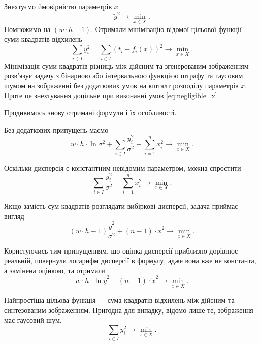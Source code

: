 Знехтуємо ймовірністю параметрів $x$
\begin{equation*}
  \widetilde{y}^2 \to \min\limits_{x \in X}.
\end{equation*}
Помножимо на $\left( w \cdot h - 1 \right)$.
Отримали мінімізацію відомої цільової функції --- суми квадратів відхилень
\begin{equation*}
  \sum_{i \in I} y_i^2
  = \sum_{i \in I} \left( t_i - f_i\left( x \right) \right)^2
  \to \min\limits_{x \in X}.
\end{equation*}
Мінімізація суми квадратів різниць між дійсним та згенерованим зображенням
розв'язує задачу з бінарною або інтервальною функцією штрафу
та гаусовим шумом на зображенні без додаткових умов
на кшталт розподілу параметрів $x$.
Проте це знехтування доцільне при виконанні умов \eqref{eq:negligible_x}.

Продивимось знову отримані формули і їх особливості.

Без додаткових припущень маємо
\begin{equation}\label{eq:minimize}
  w \cdot h \cdot \ln{\sigma^2}
  + \sum_{i \in I} \frac{ y_i^2}{\sigma^2}
  + \sum_{i = 1}^n x_i^2
  \to \min\limits_{x \in X}.
\end{equation}

Оскільки дисперсія є константним невідомим параметром,
можна спростити
\begin{equation}\label{eq:minimize}
  \sum_{i \in I} \frac{ y_i^2}{\sigma^2}
  + \sum_{i = 1}^n x_i^2
  \to \min\limits_{x \in X}.
\end{equation}

Якщо замість сум квадратів розглядати вибіркові дисперсії,
задача приймає вигляд
\begin{equation}\label{eq:minimize}
  \left( w \cdot h - 1 \right) \frac{\widetilde{y}^2}{\sigma^2}
  + \left( n - 1 \right) \cdot \widetilde{x}^2
  \to \min\limits_{x \in X}.
\end{equation}

Користуючись тим припущенням,
що оцінка дисперсії приблизно дорівнює реальній,
повернули логарифм дисперсії в формулу,
адже вона вже не константа, а замінена оцінкою, та отримали
\begin{equation}\label{eq:minimize}
  w \cdot h \cdot \ln{\widetilde{y}^2}
  + \left( n - 1 \right) \cdot \widetilde{x}^2
  \to \min\limits_{x \in X}.
\end{equation}

Найпростіша цільова функція --- сума квадратів відхилень
між дійсним та синтезованим зображенням.
Пригодна для випадку, відомо лише те, зображення має гаусовий шум.
\begin{equation*}
  \sum_{i \in I} y_i^2
  \to \min\limits_{x \in X}.
\end{equation*}


